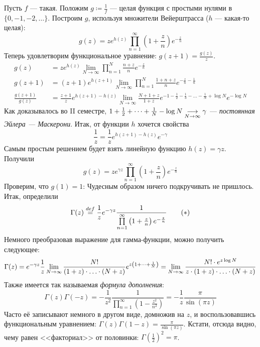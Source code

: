 \documentclass[a4paper]{report}
\begin{document}
    Пусть $f$ --- такая.
    Положим $g \coloneqq \frac{1}{f}$ --- целая функция с простыми нулями в $\{0, -1, -2, \dots\}$.
    Построим $g$, используя множители Вейерштрасса ($h$ --- какая-то целая):
    \[g(z) = z e^{h(z)} \prod\limits_{n = 1}^{\infty}\left(1 + \frac{z}{n}\right)e^{-\frac{z}{n}}\]
    Теперь удовлетворим функциональное уравнение: $g(z + 1) = \frac{g(z)}{z}$.
    \begin{align*}g(z) &= z e^{h(z)}\lim\limits_{N \to \infty}\prod\limits_{n = 1}^{N}\frac{n + z}{n}e^{-\frac{z}{n}}\\
    g(z + 1) &= (z + 1)e^{h(z + 1)}\lim\limits_{N \to \infty}\prod\limits_{n = 1}^{N}\frac{1 + n + z}{n}e^{-\frac{z}{n} - \frac{1}{n}}\\
    \frac{g(z + 1)}{g(z)} &= \frac{z + 1}{z}e^{h(z + 1) - h(z)}\lim\limits_{N \to \infty}\frac{N + 1 + z}{1 + z}e^{-1 - \frac{1}{2} - \frac{1}{3} - \dots - \frac{1}{N} + \log N}e^{-\log N}\end{align*}
    Как доказывалось во II семестре, $1 + \frac{1}{2} + \dots + \frac{1}{N} - \log N \underset{N \to \infty}{\longrightarrow} \gamma$ --- \emph{постоянная Эйлера --- Маскерони}.
    Итак, от функции $h$ хочется свойства
    \[\frac{1}{z} = \frac{1}{z}e^{h(z + 1) - h(z)}e^{-\gamma}\]
    Самым простым решением будет взять линейную функцию $h(z) = \gamma z$.
    Получили
    \[g(z) = z e^{\gamma z}\prod\limits_{n = 1}^{\infty}\left(1 + \frac{z}{n}\right)e^{-\frac{z}{n}}\]
    Проверим, что $g(1) = 1$:
    Чудесным образом ничего подкручивать не пришлось.
    Итак, определили
    \[\Gamma(z) \overset{def}{=} \frac{1}{z}e^{-\gamma z} \frac{1}{\prod\limits_{n = 1}^{\infty}\left(1 + \frac{z}{n}\right)e^{-\frac{z}{n}}}\tag{$*$}\label{gamma-def}\]
    Немного преобразовав выражение для гамма-функции, можно получить следующее:
    \[\Gamma(z) = e^{-\gamma z}\frac{1}{z}\lim\limits_{N \to \infty}\frac{N!}{(1 + z)\cdot\ldots\cdot (N + z)}e^{z\left(1 + \dots + \frac{1}{N}\right)} = \lim\limits_{N \to \infty}\frac{N! \cdot e^{z \log N}}{z\cdot  (1 + z)\cdot\ldots\cdot (N + z)}\]
    Также имеется так называемая \emph{формула дополнения}:
    \[\Gamma(z)\Gamma(-z) = -\frac{1}{z^2}\frac{1}{\prod\limits_{n = 1}^{\infty}\left(1 - \frac{z^2}{n^2}\right)} = -\frac{1}{z}\frac{\pi}{\sin \left(\pi z\right)}\]
    Часто её записывают немного в другом виде, домножив на $z$, и воспользовавшись функциональным уравнением: $\Gamma(z)\Gamma(1 - z) = \frac{\pi}{\sin \left(\pi z\right)}$.
    Кстати, отсюда видно, чему равен <<факториал>> от половинки: $\Gamma\left(\frac{1}{2}\right)^2 = \pi$.
\end{document}
